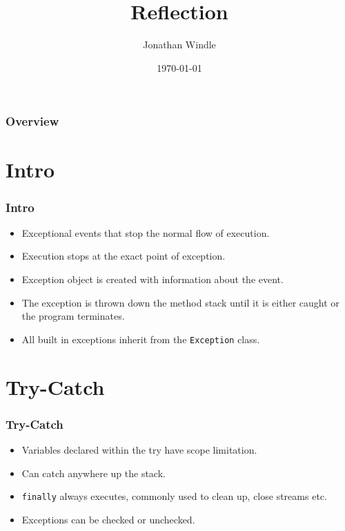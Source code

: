 \documentclass{beamer}
\title[Reflection]{Reflection} %
\author{Jonathan Windle} %
\institute[UEA] %
{
University of East Anglia \\ %
\medskip
\textit{J.Windle@uea.ac.uk} %
}
\date{\today} %
\begin{document}
\begin{frame}
\titlepage %
\end{frame}

\begin{frame}[allowframebreaks]
\frametitle{Overview} %
\tableofcontents %
\end{frame}

\section{Intro}
\begin{frame}
\frametitle{Intro}
\begin{itemize}
\item Exceptional events that stop the normal flow of execution.
\item Execution stops at the exact point of exception.
\item {\color{red} Exception object} is created with information about the event.
\item The exception is {\color{green}thrown} down the method stack until it is either {\color{orange} caught} or the program terminates.
\item All built in exceptions inherit from the \texttt{Exception} class.
\end{itemize}
\end{frame}
\section{Try-Catch}
\begin{frame}
\frametitle{Try-Catch}
\try
\begin{itemize}
\item Variables declared within the try have scope limitation.
\item Can catch anywhere up the stack.
\item \texttt{finally} always executes, commonly used to clean up, close streams etc.
\item Exceptions can be checked or unchecked.
\end{itemize}
\end{frame}
\end{document}
